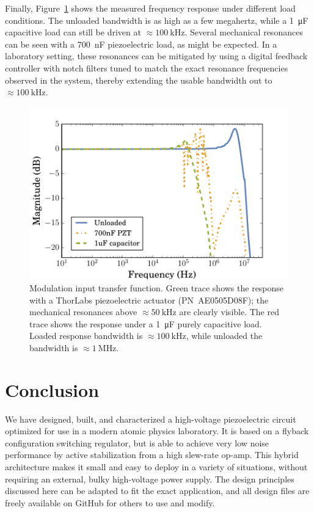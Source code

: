 \documentclass[aip,rsi,reprint]{revtex4-1} %
\begin{document}
Finally, Figure~\ref{Fig:TransferFunc} shows the measured frequency response under different load conditions. The unloaded bandwidth is as high as a few megahertz, while a \SI{1}{\micro\farad} capacitive load can still be driven at $\approx\SI{100}{\kilo\hertz}$. 
Several mechanical resonances can be seen with a \SI{700}{\nano\farad} piezoelectric load, as might be expected.
In a laboratory setting, these resonances can be mitigated by using a digital feedback controller with notch filters tuned to match the exact resonance frequencies observed in the system\cite{Ryou2016a}, thereby extending the usable bandwidth out to $\approx\SI{100}{\kilo\hertz}$.
\begin{figure}[h]
\includegraphics[width=\columnwidth]{fig/PiezoModulationTransfer.pdf}
\caption{Modulation input transfer function. Green trace shows the response with a ThorLabs piezoelectric actuator {(PN~AE0505D08F)}; the mechanical resonances above $\approx\SI{50}{\kilo\hertz}$ are clearly visible. The red trace shows the response under a \SI{1}{\micro\farad} purely capacitive load. Loaded response bandwidth is $\approx\SI{100}{\kilo\hertz}$, while unloaded the bandwidth is $\approx\SI{1}{\mega\hertz}$.\label{Fig:TransferFunc}}
\end{figure}

\section{Conclusion}
\label{Sec:Conclusion}

We have designed, built, and characterized a high-voltage piezoelectric circuit optimized for use in a modern atomic physics laboratory.
It is based on a flyback configuration switching regulator, but is able to achieve very low noise performance by active stabilization from a high slew-rate op-amp.
This hybrid architecture makes it small and easy to deploy in a variety of situations, without requiring an external, bulky high-voltage power supply.
The design principles discussed here can be adapted to fit the exact application, and all design files are freely available on GitHub for others to use and modify.
\end{document}
